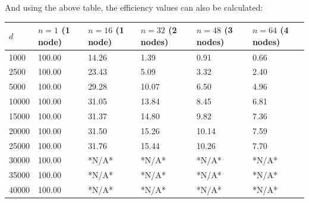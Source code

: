 \documentclass[11pt]{article}
\begin{document}
\begin{appendices}
{\normalsize And using the above table, the efficiency values can also be calculated:}
\footnotesize{
\begin{center}
\begin{tabular}{|l|l|l|l|l|l|}
\hline
$d$ & $n=1$ (1 node) & $n=16$ (1 node) & $n=32$ (2 nodes) & $n=48$ (3 nodes) & $n=64$ (4 nodes)\\
\hline
1000 & 100.00 & 14.26 & 1.39 & 0.91 & 0.66\\
2500 & 100.00 & 23.43 & 5.09 & 3.32 & 2.40\\
5000 & 100.00 & 29.28 & 10.07 & 6.50 & 4.96\\
10000 & 100.00 & 31.05 & 13.84 & 8.45 & 6.81\\
15000 & 100.00 & 31.37 & 14.80 & 9.82 & 7.36\\
20000 & 100.00 & 31.50 & 15.26 & 10.14 & 7.59\\
25000 & 100.00 & 31.76 & 15.44 & 10.26 & 7.70\\
30000 & 100.00 & *N/A* & *N/A* & *N/A* & *N/A*\\ 
35000 & 100.00 & *N/A* & *N/A* & *N/A* & *N/A*\\ 
40000 & 100.00 & *N/A* & *N/A* & *N/A* & *N/A*\\ 
\hline
\end{tabular}
\end{center}
}

\newpage
{\color{darkindigo}
}
\end{appendices}
\end{document}
